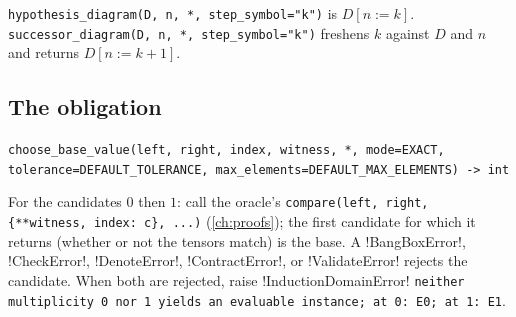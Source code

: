 \texttt{hypothesis\_\allowbreak{}diagram(\allowbreak{}D,\allowbreak{} n,\allowbreak{} *,\allowbreak{} step\_\allowbreak{}symbol="k")} is $D[n:=k]$. \texttt{successor\_\allowbreak{}diagram(\allowbreak{}D,\allowbreak{} n,\allowbreak{} *,\allowbreak{} step\_\allowbreak{}symbol="k")} freshens $k$ against $D$ and $n$ and returns $D[n:=k+1]$.

\subsection{The obligation}\label{sec:kernel-obligation}

\begin{signature}
\texttt{choose\_\allowbreak{}base\_\allowbreak{}value(\allowbreak{}left,\allowbreak{} right,\allowbreak{} index,\allowbreak{} witness,\allowbreak{} *,\allowbreak{} mode=EXACT,\allowbreak{} tolerance=DEFAULT\_\allowbreak{}TOLERANCE,\allowbreak{} max\_\allowbreak{}elements=DEFAULT\_\allowbreak{}MAX\_\allowbreak{}ELEMENTS) -> int}

For the candidates $0$ then $1$: call the oracle's \texttt{compare(\allowbreak{}left,\allowbreak{} right,\allowbreak{} \{**witness,\allowbreak{} index: c\},\allowbreak{} .\allowbreak{}.\allowbreak{}.\allowbreak{})} (\cref{ch:proofs}); the first candidate for which it returns (whether or not the tensors match) is the base. A \py!BangBoxError!, \py!CheckError!, \py!DenoteError!, \py!ContractError!, or \py!ValidateError! rejects the candidate. When both are rejected, raise \py!InductionDomainError! \texttt{neither multiplicity 0 nor 1 yields an evaluable instance; at 0: E0; at 1: E1}.
\end{signature}

